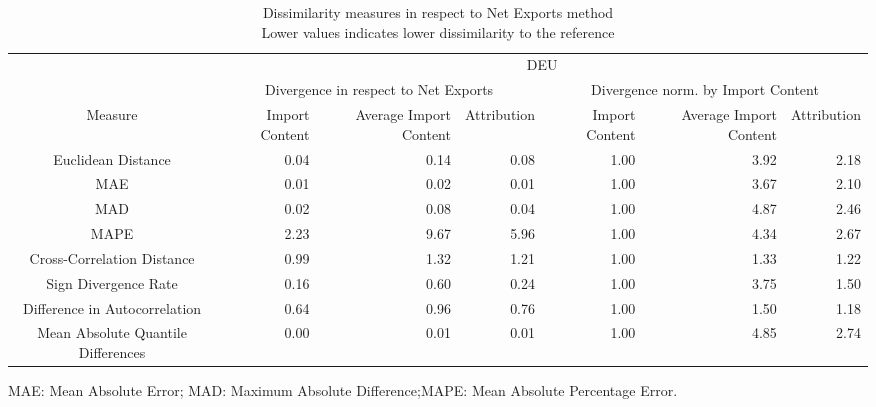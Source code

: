 \begin{table}[t]
\caption*{
{\large Dissimilarity measures in respect to Net Exports method} \\ 
{\small Lower values indicates lower dissimilarity to the reference}
} 
\fontsize{15.0pt}{18.0pt}\selectfont
\begin{tabular*}{\linewidth}{@{\extracolsep{\fill}}crrrrrr}
\toprule
 & \multicolumn{6}{c}{DEU} \\ 
\cmidrule(lr){2-7}
 & \multicolumn{3}{c}{Divergence in respect to Net Exports} & \multicolumn{3}{c}{Divergence norm. by Import Content} \\ 
\cmidrule(lr){2-4} \cmidrule(lr){5-7}
Measure & Import Content & Average Import Content & Attribution & Import Content & Average Import Content & Attribution \\ 
\midrule\addlinespace[2.5pt]
Euclidean Distance & 0.04 & 0.14 & 0.08 & 1.00 & 3.92 & 2.18 \\ 
MAE & 0.01 & 0.02 & 0.01 & 1.00 & 3.67 & 2.10 \\ 
MAD & 0.02 & 0.08 & 0.04 & 1.00 & 4.87 & 2.46 \\ 
MAPE & 2.23 & 9.67 & 5.96 & 1.00 & 4.34 & 2.67 \\ 
Cross-Correlation Distance & 0.99 & 1.32 & 1.21 & 1.00 & 1.33 & 1.22 \\ 
Sign Divergence Rate & 0.16 & 0.60 & 0.24 & 1.00 & 3.75 & 1.50 \\ 
Difference in Autocorrelation & 0.64 & 0.96 & 0.76 & 1.00 & 1.50 & 1.18 \\ 
Mean Absolute Quantile Differences & 0.00 & 0.01 & 0.01 & 1.00 & 4.85 & 2.74 \\ 
\bottomrule
\end{tabular*}
\begin{minipage}{\linewidth}
MAE: Mean Absolute Error; MAD: Maximum Absolute Difference;MAPE: Mean Absolute Percentage Error.\\
\end{minipage}
\end{table}

